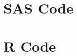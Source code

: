 \documentclass[11pt]{article}
\begin{document}
\pagebreak
\section{SAS Code}


\pagebreak
\section{R Code}

\end{document}
